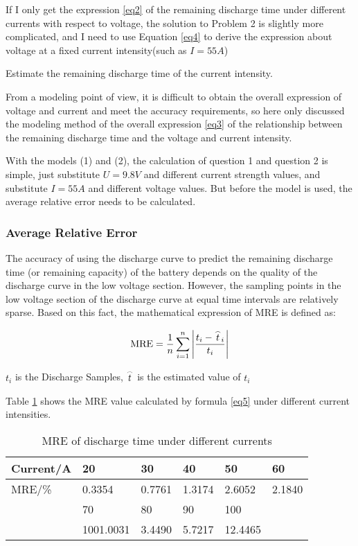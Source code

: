 \documentclass[conference]{IEEEtran}
\begin{document}
  If  I only get the expression \eqref{eq2} of the remaining discharge time under different currents with respect to voltage, the solution to Problem 2 is slightly more complicated, and I need to use Equation \eqref{eq4} to derive the expression about voltage at a fixed current intensity(such as $I=55A$)
  
  Estimate the remaining discharge time of the current intensity.
  
  From a modeling point of view, it is difficult to obtain the overall expression of voltage and current and meet the accuracy requirements, so here only discussed the modeling method of the overall expression \eqref{eq3} of the relationship between the remaining discharge time and the voltage and current intensity.
  
  With the models (1) and (2), the calculation of question 1 and question 2 is simple, just substitute $U=9.8V$ and different current strength values, and substitute $I=55A$ and different voltage values. But before the model is used, the average relative error needs to be calculated.
  
  \subsubsection{Average Relative Error} The accuracy of using the discharge curve to predict the remaining discharge time (or remaining capacity) of the battery depends on the quality of the discharge curve in the low voltage section. However, the sampling points in the low voltage section of the discharge curve at equal time intervals are relatively sparse. Based on this fact, the mathematical expression of MRE is defined as:
  
  \begin{equation}
{\rm{MRE}} = \frac{1}{n}\sum\limits_{i = 1}^n {\left| {\frac{{{t_i} - {{\mathord{\buildrel{\lower3pt\hbox{$\scriptscriptstyle\frown$}} 
  							\over t} }_i}}}{{{t_i}}}} \right|} 
  						\label{eq5}
  \end{equation}
  
  $t_i$ is the Discharge Samples, $\mathord{\buildrel{\lower3pt\hbox{$\scriptscriptstyle\frown$}} 
  	\over t} $ is the estimated value of  $t_i$ 
  
 Table \ref{tab1} shows the MRE value calculated by formula \eqref{eq5} under different current intensities.
\begin{table}[htbp]
	\caption{MRE of discharge time under different currents}
	\label{tab1}
	\begin{tabular}{|l|l|l|l|l|l|}
		\hline
		Current/A & 20 & 30 & 40 & 50 &      60  \\ \hline
		MRE/\% & 0.3354 & 0.7761 & 1.3174 & 2.6052 &2.1840 \\ \hline
		   & 70 & 80 & 90 &  100 &  \\  \hline 
         	 &	1001.0031 & 3.4490 & 5.7217 & 12.4465 &  \\  \hline
	\end{tabular}
\end{table}
\end{document}
